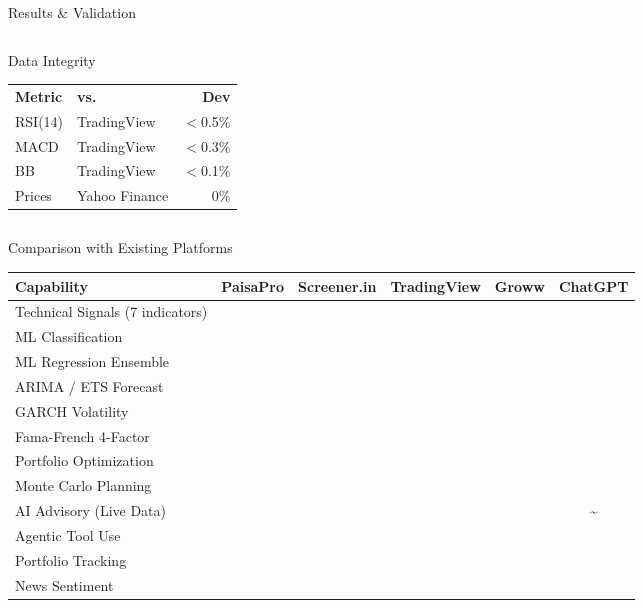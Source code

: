 \documentclass[aspectratio=169, 11pt]{beamer}
\newcommand{\cmark}{\textcolor{ppGreen}{\ding{51}}}
\newcommand{\xmark}{\textcolor{ppRed}{\ding{55}}}
\newcommand{\tmark}{\textcolor{ppAmber}{\textasciitilde}}
\begin{document}
\begin{frame}{Results \& Validation}
\begin{columns}[T]
\vspace{0.1cm}
\begin{block}{Data Integrity}
\footnotesize
\renewcommand{\arraystretch}{1.25}
\begin{tabular}{@{}l l r@{}}
  \textbf{Metric} & \textbf{vs.} & \textbf{Dev} \\
  RSI(14) & TradingView & $<$0.5\% \\
  MACD & TradingView & $<$0.3\% \\
  BB & TradingView & $<$0.1\% \\
  Prices & Yahoo Finance & 0\% \\
\end{tabular}
\end{block}
\end{columns}
\end{frame}

\begin{frame}{Comparison with Existing Platforms}
\begin{center}
\small
\renewcommand{\arraystretch}{1.15}
\begin{tabular}{@{}l c c c c c@{}}
\toprule
\textbf{Capability} & \textbf{\textcolor{ppAccent}{PaisaPro}} & \textbf{Screener.in} & \textbf{TradingView} & \textbf{Groww} & \textbf{ChatGPT} \\
\midrule
Technical Signals (7 indicators) & \cmark & \xmark & \cmark & \xmark & \xmark \\
ML Classification & \cmark & \xmark & \xmark & \xmark & \xmark \\
ML Regression Ensemble & \cmark & \xmark & \xmark & \xmark & \xmark \\
ARIMA / ETS Forecast & \cmark & \xmark & \xmark & \xmark & \xmark \\
GARCH Volatility & \cmark & \xmark & \xmark & \xmark & \xmark \\
Fama-French 4-Factor & \cmark & \xmark & \xmark & \xmark & \xmark \\
Portfolio Optimization & \cmark & \xmark & \xmark & \xmark & \xmark \\
Monte Carlo Planning & \cmark & \xmark & \xmark & \xmark & \xmark \\
AI Advisory (Live Data) & \cmark & \xmark & \xmark & \xmark & \tmark \\
Agentic Tool Use & \cmark & \xmark & \xmark & \xmark & \xmark \\
Portfolio Tracking & \cmark & \xmark & \xmark & \cmark & \xmark \\
News Sentiment & \cmark & \xmark & \xmark & \xmark & \xmark \\
\bottomrule
\end{tabular}
\end{center}

\vspace{0.3cm}
\begin{center}
\end{center}
\end{frame}
\end{document}
